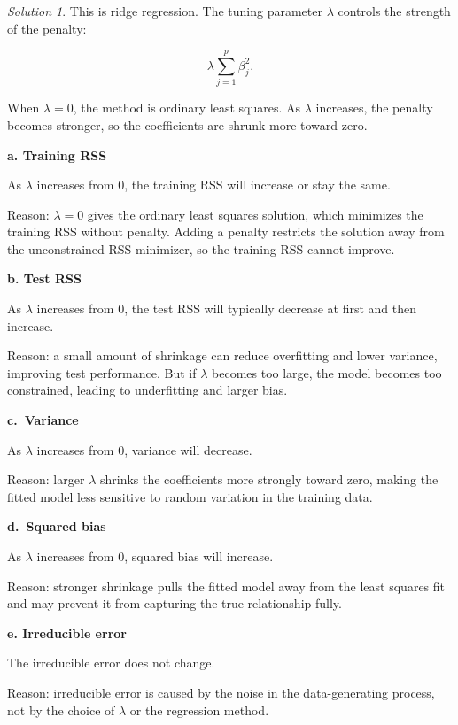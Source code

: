 \documentclass[
  english,
]{article}
\theoremstyle{definition}
\theoremstyle{definition}
\theoremstyle{remark}
\newtheorem*{solution}{Solution}
\begin{document}
\begin{solution}
This is ridge regression. The tuning parameter \(\lambda\) controls the
strength of the penalty:

\[
\lambda \sum_{j=1}^p \beta_j^2.
\]

When \(\lambda=0\), the method is ordinary least squares. As \(\lambda\)
increases, the penalty becomes stronger, so the coefficients are shrunk
more toward zero.

\textbf{a. Training RSS}

As \(\lambda\) increases from \(0\), the training RSS will increase or
stay the same.

Reason: \(\lambda=0\) gives the ordinary least squares solution, which
minimizes the training RSS without penalty. Adding a penalty restricts
the solution away from the unconstrained RSS minimizer, so the training
RSS cannot improve.

\textbf{b. Test RSS}

As \(\lambda\) increases from \(0\), the test RSS will typically
decrease at first and then increase.

Reason: a small amount of shrinkage can reduce overfitting and lower
variance, improving test performance. But if \(\lambda\) becomes too
large, the model becomes too constrained, leading to underfitting and
larger bias.

\textbf{c.~Variance}

As \(\lambda\) increases from \(0\), variance will decrease.

Reason: larger \(\lambda\) shrinks the coefficients more strongly toward
zero, making the fitted model less sensitive to random variation in the
training data.

\textbf{d.~Squared bias}

As \(\lambda\) increases from \(0\), squared bias will increase.

Reason: stronger shrinkage pulls the fitted model away from the least
squares fit and may prevent it from capturing the true relationship
fully.

\textbf{e. Irreducible error}

The irreducible error does not change.

Reason: irreducible error is caused by the noise in the data-generating
process, not by the choice of \(\lambda\) or the regression method.
\end{solution}
\end{document}
